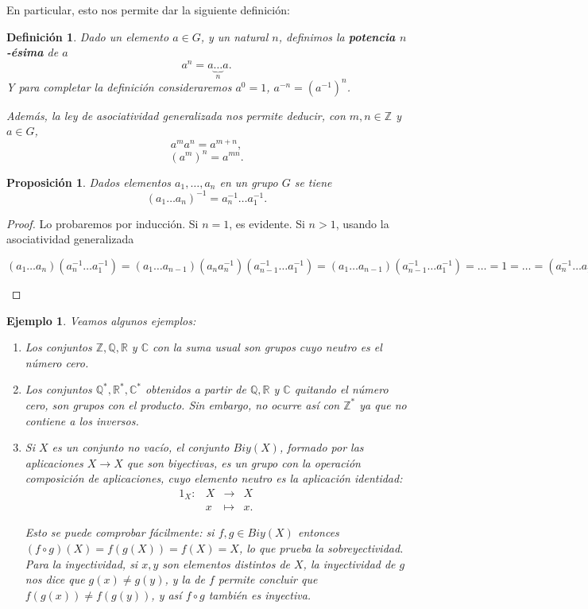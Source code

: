 \documentclass[12pt]{article}
\newtheorem{proposition}[theorem]{Proposición}
\newtheorem{definition}[theorem]{Definición}
\newtheorem{example}{Ejemplo}[theorem]
\begin{document}
En particular, esto nos permite dar la siguiente definición: 

\begin{definition}Dado un elemento $a\in G$, y un natural $n$, definimos la \textbf{potencia $n$-ésima} de $a$ $$a^n = a \underbrace{\ldots}_n a.$$ Y para completar la definición consideraremos $a^0 =1$, $a^{-n} = (a^{-1})^n$.

Además, la ley de asociatividad generalizada nos permite deducir, con $m,n \in \mathbb{Z}$ y $a\in G$, $$a^ma^n = a^{m+n},$$ $$(a^m)^n = a^{mn}.$$
\end{definition}

\begin{proposition}Dados elementos $a_1, \ldots, a_n$ en un grupo $G$ se tiene $$(a_1 \ldots a_n)^{-1} = a_n^{-1} \ldots a_1^{-1}.$$
\end{proposition}
\begin{proof}
Lo probaremos por inducción. Si $n = 1$, es evidente. Si $n>1$, usando la asociatividad generalizada \begin{center}$(a_1\ldots a_n)(a_n^{-1} \ldots a_1^{-1}) = (a_1\ldots a_{n-1})(a_na_n^{-1})(a_{n-1}^{-1} \ldots a_1^{-1}) = (a_1\ldots a_{n-1})(a_{n-1}^{-1} \ldots a_1^{-1}) = \ldots = 1 = \ldots = (a_n^{-1} \ldots a_2^{-1}) (a_2\ldots a_n) =(a_n^{-1} \ldots a_2^{-1})(a_1^{-1}a_1)(a_2\ldots a_n) = (a_n^{-1} \ldots a_1^{-1})(a_1\ldots a_n)$\end{center}

\end{proof}

\begin{example}Veamos algunos ejemplos:
\begin{enumerate}
\item Los conjuntos $\mathbb{Z}, \mathbb{Q}, \mathbb{R}$ y $\mathbb{C}$ con la suma usual son grupos cuyo neutro es el número cero.
\item Los conjuntos $\mathbb{Q}^\ast, \mathbb{R}^\ast, \mathbb{C}^\ast$ obtenidos a partir de $\mathbb{Q}, \mathbb{R}$ y $\mathbb{C}$ quitando el número cero, son grupos con el producto. Sin embargo, no ocurre así con $\mathbb{Z}^\ast$ ya que no contiene a los inversos.
\item Si $X$ es un conjunto no vacío, el conjunto $Biy(X)$, formado por las aplicaciones $X \longrightarrow X$ que son biyectivas, es un grupo con la operación composición de aplicaciones, cuyo elemento neutro es la aplicación identidad: 
$$\begin{array}{rccl}
1_X \colon &X & \longrightarrow & X\\
&x & \longmapsto &x.
\end{array}
$$

Esto se puede comprobar fácilmente: si $f,g \in Biy(X)$ entonces $(f \circ g)(X) = f(g(X)) = f(X) = X$, lo que prueba la sobreyectividad. Para la inyectividad, si $x,y$ son elementos distintos de $X$, la inyectividad de $g$ nos dice que $g(x) \neq g(y)$, y la de $f$ permite concluir que $f(g(x)) \neq f(g(y))$, y así $f \circ g$ también es inyectiva.
\end{enumerate}
\end{example}
\end{document}
